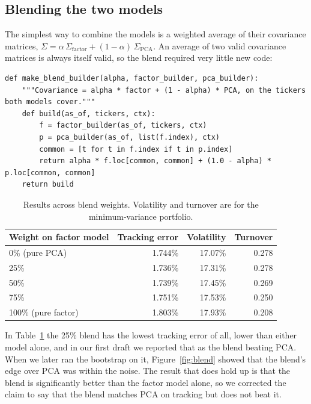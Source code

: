 \documentclass[11pt,letterpaper]{article}
\begin{document}
\subsection{Blending the two models}

The simplest way to combine the models is a weighted average of their covariance matrices,
$\Sigma = \alpha\,\Sigma_{\text{factor}} + (1-\alpha)\,\Sigma_{\text{PCA}}$. An average of
two valid covariance matrices is always itself valid, so the blend required very little new
code:

\begin{lstlisting}
def make_blend_builder(alpha, factor_builder, pca_builder):
    """Covariance = alpha * factor + (1 - alpha) * PCA, on the tickers both models cover."""
    def build(as_of, tickers, ctx):
        f = factor_builder(as_of, tickers, ctx)
        p = pca_builder(as_of, list(f.index), ctx)
        common = [t for t in f.index if t in p.index]
        return alpha * f.loc[common, common] + (1.0 - alpha) * p.loc[common, common]
    return build
\end{lstlisting}

\begin{table}[H]
\centering\small
\begin{tabular}{@{}lrrr@{}}
\toprule
\textbf{Weight on factor model} & \textbf{Tracking error} & \textbf{Volatility} & \textbf{Turnover} \\
\midrule
0\% (pure PCA) & 1.744\% & 17.07\% & 0.278 \\
25\% & 1.736\% & 17.31\% & 0.278 \\
50\% & 1.739\% & 17.45\% & 0.269 \\
75\% & 1.751\% & 17.53\% & 0.250 \\
100\% (pure factor) & 1.803\% & 17.93\% & 0.208 \\
\bottomrule
\end{tabular}
\caption{Results across blend weights. Volatility and turnover are for the
minimum-variance portfolio.}
\label{tab:blend}
\end{table}

In Table~\ref{tab:blend} the 25\% blend has the lowest tracking error of all, lower than
either model alone, and in our first draft we reported that as the blend beating PCA. When
we later ran the bootstrap on it, Figure~\ref{fig:blend} showed that the blend's edge over
PCA was within the noise. The result that does hold up is that the blend is significantly
better than the factor model alone, so we corrected the claim to say that the blend matches
PCA on tracking but does not beat it.
\end{document}
